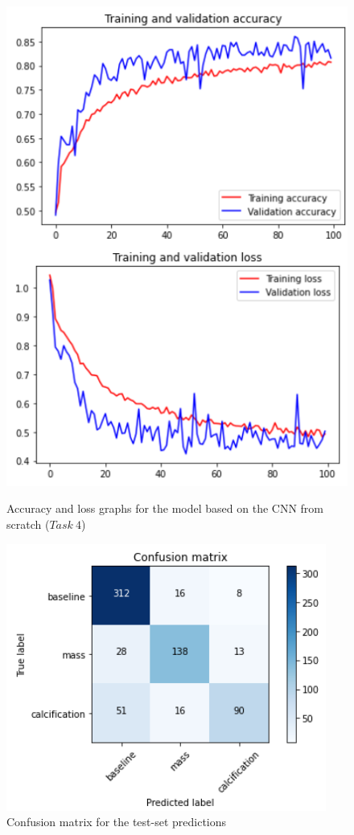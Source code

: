\documentclass[11pt,a4paper,oneside]{article}
\begin{document}
\begin{figure}[h]
\centering
	\begin{minipage}[c]{.4\textwidth}
		\centering\setlength{\captionmargin}{0pt}%
		\includegraphics[width=.9\textwidth]{images/4.1/1_acc}
		\caption{Accuracy and loss graphs for the model based on the CNN from scratch ($Task\ 4$)}
		\label{fig:baseline_acc_1}
	\end{minipage}
	\hspace{5mm}%
	\begin{minipage}[c]{.4\textwidth}
		\centering\setlength{\captionmargin}{0pt}%
		\includegraphics[width=.9\textwidth]{images/4.1/1_matrix}
		\caption{Confusion matrix for the test-set predictions}
		\label{fig:baseline_matrix_1}
	\end{minipage}%
\end{figure}
\end{document}
